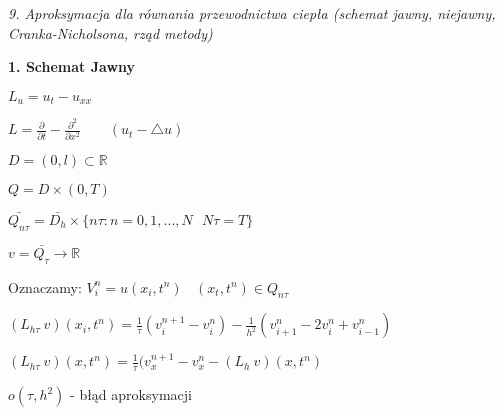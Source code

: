 \textit{9. Aproksymacja dla równania przewodnictwa ciepła (schemat jawny, niejawny, Cranka-Nicholsona, rząd metody)}

\textbf{1. Schemat Jawny}

$L_u = u_t - u_{xx}$

$L = \frac{\partial}{\partial t} - \frac{\partial^2}{\partial x^2}\ \ \ \ \ \ \ \ \ (u_t - \bigtriangleup u)$

$D = (0,l) \subset \mathbb{R}$

$Q = D \times (0,T)$

$\bar{Q_{n\tau}} = \bar{D_h} \times \{ n\tau : n = 0, 1, ..., N\ \ \ N\tau = T\}$

$v = \bar{Q_\tau} \rightarrow \mathbb{R}$

Oznaczamy: $V^n_i = u(x_i,t^n)\ \ \ \ (x_t,t^n) \in Q_{n\tau}$

$(L_{h\tau}\ v)(x_i, t^n) = \frac{1}{\tau} (v^{n+1}_i - v^n_i) - \frac{1}{h^2} (v^n_{i+1} - 2v^n_i + v^n_{i-1})$

$(L_{h\tau}\ v)(x, t^n) = \frac{1}{\tau} (v^{n+1}_x - v^n_x - (L_h\ v)(x, t^n)$

$o(\tau, h^2)$ - błąd aproksymacji